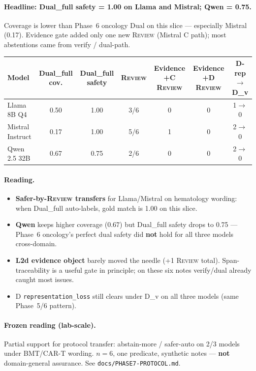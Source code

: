 \documentclass[11pt,a4paper]{article}
\newcommand{\rev}{\textsc{Review}}
\begin{document}
\paragraph{Headline: Dual\_full safety = 1.00 on Llama and Mistral; Qwen = 0.75.}
Coverage is lower than Phase~6 oncology Dual on this slice --- especially Mistral (0.17).
Evidence gate added only one new \rev{} (Mistral C path); most abstentions came from verify / dual-path.

\begin{center}
\small
\begin{tabular}{lcccccc}
\toprule
Model & Dual\_full cov. & Dual\_full safety & \rev{} & Evidence +C \rev{} & Evidence +D \rev{} & D-rep $\rightarrow$ D\_v \\
\midrule
Llama 8B Q4 & 0.50 & 1.00 & 3/6 & 0 & 0 & 1$\rightarrow$0 \\
Mistral Instruct & 0.17 & 1.00 & 5/6 & 1 & 0 & 2$\rightarrow$0 \\
Qwen 2.5 32B & 0.67 & 0.75 & 2/6 & 0 & 0 & 2$\rightarrow$0 \\
\bottomrule
\end{tabular}
\end{center}

\paragraph{Reading.}
\begin{itemize}
  \item \textbf{Safer-by-\rev{} transfers} for Llama/Mistral on hematology wording: when Dual\_full auto-labels, gold match is 1.00 on this slice.
  \item \textbf{Qwen} keeps higher coverage (0.67) but Dual\_full safety drops to 0.75 --- Phase~6 oncology's perfect dual safety did \textbf{not} hold for all three models cross-domain.
  \item \textbf{L2d evidence object} barely moved the needle (+1 \rev{} total). Span-traceability is a useful gate in principle; on these six notes verify/dual already caught most issues.
  \item D \texttt{representation\_loss} still clears under D\_v on all three models (same Phase~5/6 pattern).
\end{itemize}

\paragraph{Frozen reading (lab-scale).}
Partial support for protocol transfer: abstain-more / safer-auto on 2/3 models under BMT/CAR-T wording.
$n=6$, one predicate, synthetic notes --- \textbf{not} domain-general assurance.
See \texttt{docs/PHASE7-PROTOCOL.md}.
\end{document}
